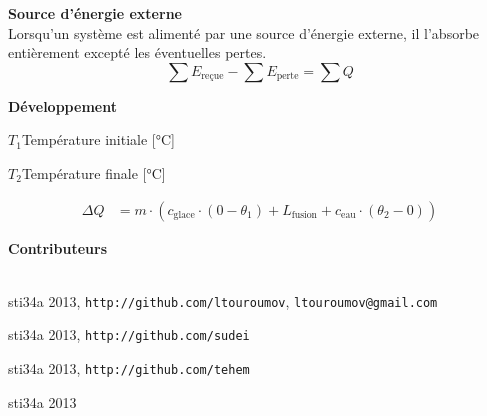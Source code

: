 \documentclass[12pt,a4paper]{article} %
\newcommand\frametitle[1]{ {\bfseries #1} \\[5pt] }
\begin{document}
\frametitle{Source d'énergie externe}
Lorsqu'un système est alimenté par une source d'énergie externe, il l'absorbe entièrement excepté les éventuelles pertes.
\[\sum E_\text{reçue} - \sum E_\text{perte} = \sum Q\]

\frametitle{Développement}
\begin{vardef}
	\item{$T_1$}{Température initiale [°C]}
	\item{$T_2$}{Température finale [°C]}
\end{vardef}
\begin{align*}
	\Delta Q &= m \cdot (c_\text{glace} \cdot (0-\theta_1) + L_\text{fusion} + c_\text{eau} \cdot (\theta_2 - 0))
\end{align*}

\newpage

\tableofcontents
\vspace{2em}
\frametitle{\large Contributeurs} \\
\begin{description}[style=nextline]
	\item[Jeremy David] sti34a 2013, \texttt{http://github.com/ltouroumov}, \texttt{ltouroumov@gmail.com}
	\item[Kevin Wenger] sti34a 2013, \texttt{http://github.com/sudei}
	\item[Timothée Moulin] sti34a 2013, \texttt{http://github.com/tehem}
	\item[Vincent Kobel] sti34a 2013
\end{description}

\end{document}
